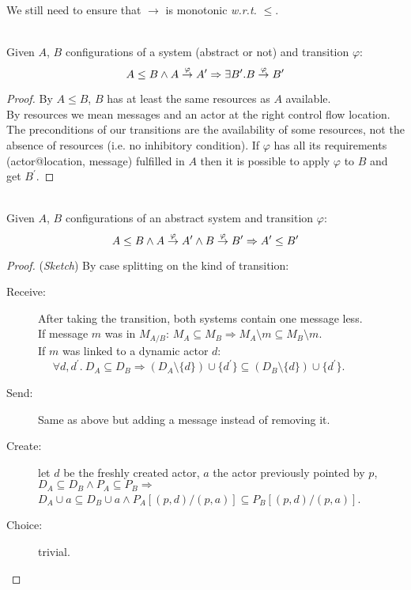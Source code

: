 \documentclass[a4paper]{report}
\numberwithin{algorithm}{chapter}
\begin{document}
We still need to ensure that $\rightarrow$ is monotonic \emph{w.r.t.} $\leq$.

\begin{lem}
\label{lemTransition} \mbox{}\\
Given $A$, $B$ configurations of a system (abstract or not) and transition $\varphi$:
\begin{equation*}
A \leq B \land
A \buildrel\varphi\over\rightarrow A^\prime \Rightarrow
\exists B^\prime. B \buildrel\varphi\over\rightarrow B^\prime
\end{equation*}
\end{lem}
\begin{proof}
By $A \leq B$, $B$ has at least the same resources as $A$ available.\\
By resources we mean messages and an actor at the right control flow location.
The preconditions of our transitions are the availability of some resources, not the absence of resources (i.e. no inhibitory condition).
If $\varphi$ has all its requirements (actor@location, message) fulfilled in $A$
then it is possible to apply $\varphi$ to $B$ and get $B^\prime$.
\end{proof}

\begin{thm}
\label{thmMonotonicAbs} \mbox{}\\
Given $A$, $B$ configurations of an abstract system and transition $\varphi$:
\begin{equation*}
A \leq B \land
A \buildrel\varphi\over\rightarrow A^\prime \land
B \buildrel\varphi\over\rightarrow B^\prime \Rightarrow
A^\prime \leq B^\prime
\end{equation*}
\end{thm}
\begin{proof}
(\emph{Sketch}) By case splitting on the kind of transition:
\begin{description}
\item[Receive:]
After taking the transition, both systems contain one message less.\\
If message $m$ was in $M_{A/B}$: $ M_A \subseteq M_B \Rightarrow M_A \setminus m \subseteq M_B \setminus m$.\\
If $m$ was linked to a dynamic actor $d$: \\
\mbox{} ~~ $\forall d, d^\prime. ~ D_A \subseteq D_B \Rightarrow (D_A \setminus \{d\}) \cup \{d^\prime\} \subseteq (D_B \setminus \{d\}) \cup \{d^\prime\} $.

\item[Send:] Same as above but adding a message instead of removing it.

\item[Create:] let $d$ be the freshly created actor, $a$ the actor previously pointed by $p$,\\
$D_A \subseteq D_B \land P_A \subseteq P_B \Rightarrow$\\
$D_A \cup a \subseteq D_B \cup a \land P_A[(p,d)/(p,a)] \subseteq P_B[(p,d)/(p,a)]$.

\item[Choice:] trivial.

\end{description}
\end{proof}
\end{document}
